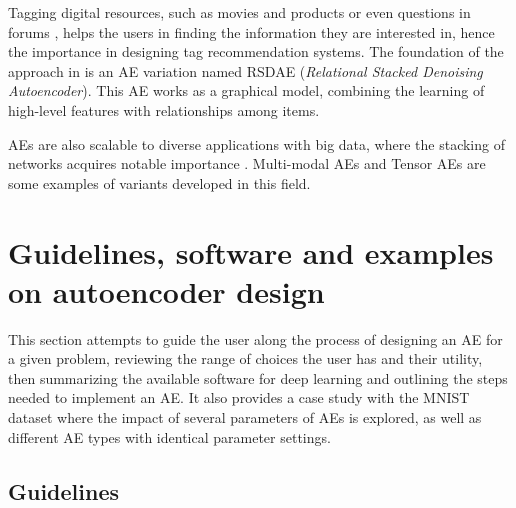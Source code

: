 Tagging digital resources, such as movies and products  or even questions in forums , helps the users in finding the information they are interested in, hence the importance in designing tag recommendation systems. The foundation of the approach in  is an AE variation named  RSDAE (\textit{Relational Stacked Denoising Autoencoder}). This AE works as a graphical model, combining the learning of high-level features with relationships among items.

AEs are also scalable to diverse applications with big data, where the stacking of networks acquires notable importance . Multi-modal AEs and Tensor AEs are some examples of variants developed in this field.

\section{Guidelines, software and examples on autoencoder design}\label{p1Sec.HowToChoose}

This section attempts to guide the user along the process of designing an AE for a given problem, reviewing the range of choices the user has and their utility, then summarizing the available software for deep learning and outlining the steps needed to implement an AE. It also provides a case study with the MNIST dataset where the impact of several parameters of AEs is explored, as well as different AE types with identical parameter settings.


\subsection{Guidelines}

